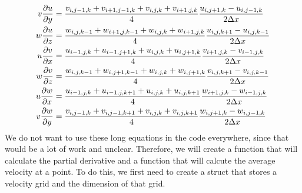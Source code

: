 \documentclass{article}
\begin{document}
\[\begin{split}
  v\pdv{u}{y}&=\frac{v_{i,j-1,k}+v_{i+1,j-1,k}+v_{i,j,k}+v_{i+1,j,k}}{4}\frac{u_{i,j+1,k}-u_{i,j-1,k}}{2\Delta x}\\
  w\pdv{u}{z}&=\frac{w_{i,j,k-1}+w_{i+1,j,k-1}+w_{i,j,k}+w_{i+1,j,k}}{4}\frac{u_{i,j,k+1}-u_{i,j,k-1}}{2\Delta x}\\
  u\pdv{v}{x}&=\frac{u_{i-1,j,k}+u_{i-1,j+1,k}+u_{i,j,k}+u_{i,j+1,k}}{4}\frac{v_{i+1,j,k}-v_{i-1,j,k}}{2\Delta x}\\
  w\pdv{v}{z}&=\frac{w_{i,j,k-1}+w_{i,j+1,k-1}+w_{i,j,k}+w_{i,j+1,k}}{4}\frac{v_{i,j,k+1}-v_{i,j,k-1}}{2\Delta x}\\
  u\pdv{w}{x}&=\frac{u_{i-1,j,k}+u_{i-1,j,k+1}+u_{i,j,k}+u_{i,j,k+1}}{4}\frac{w_{i+1,j,k}-w_{i-1,j,k}}{2\Delta x}\\
  v\pdv{w}{y}&=\frac{v_{i,j-1,k}+v_{i,j-1,k+1}+v_{i,j,k}+v_{i,j,k+1}}{4}\frac{w_{i,j+1,k}-w_{i,j-1,k}}{2\Delta x}\\
\end{split}
\] \label{average and partial}
We do not want to use these long equations in the code everywhere, since that would be a lot of work and unclear. Therefore, we will create a function that will calculate the partial derivative and a function that will calcute the average velocity at a point. To do this, we first need to create a struct that stores a velocity grid and the dimension of that grid.
\end{document}
